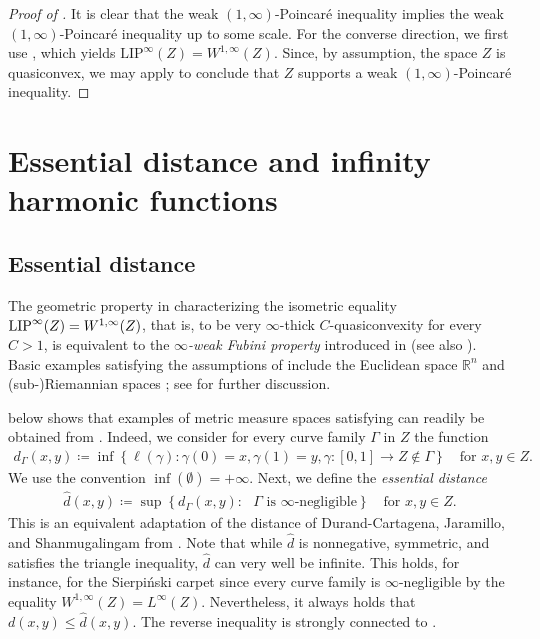 \documentclass[reqno]{amsart}
\newcommand{\LIP}{{\rm LIP}}
\numberwithin{equation}{section}
\theoremstyle{remark}
\begin{document}
\begin{proof}[Proof of ]
It is clear that the weak $(1,\infty)$-Poincaré inequality implies the weak $(1,\infty)$-Poincaré inequality up to some scale. For the converse direction, we first use , which yields $\text{LIP}^{\infty}(Z)=W^{1,\infty}(Z)$. Since, by assumption, the space $Z$ is quasiconvex, we may apply  to conclude that $Z$ supports a weak $(1,\infty)$-Poincaré inequality.
\end{proof}




\section{Essential distance and infinity harmonic functions}\label{sec:essentialdistance:proofs}

\subsection{Essential distance}
The geometric property in   characterizing the isometric equality $\LIP^{\infty}(Z)= W^{1,\infty}(Z)$, that is, to be very $\infty$-thick $C$-quasiconvexity for every $C>1$, is equivalent to the \emph{$\infty$-weak Fubini property} introduced in \cite[Definition 4.1 and Proposition 4.2]{Dur:Jar:Sha:19} (see also \cite{Juut:Shan:06}). Basic examples satisfying the assumptions of  include the Euclidean space $\mathbb{R}^n$ and (sub-)Riemannian spaces \cite{Drag:Manf:Vitt:13}; see \cite[Section 5]{Juut:Shan:06} for further discussion.

 below shows that examples of metric measure spaces satisfying  can readily be obtained from . Indeed, we consider for every curve family $\Gamma$ in $Z$ the function
\begin{align*}
    d_{\Gamma}(x,y)
    \coloneqq
    \inf\left\{
        \ell( \gamma ) \colon \gamma(0) = x, \gamma(1) = y, \gamma \colon [0,1] \rightarrow Z \not\in \Gamma
    \right\}
    \quad\text{for $x,y \in Z$.}
\end{align*}
We use the convention $\inf(\emptyset)=+\infty$. Next, we define the \emph{essential distance}
\begin{align}\label{eq:essentialdistance}
    \widehat{d}( x, y )
    \coloneqq
    \sup\left\{
        d_{\Gamma}(x,y)
        \colon
        \text{ $\Gamma$ is $\infty$-negligible}
    \right\}
    \quad\text{for $x,y \in Z$.}
\end{align}
This is an equivalent adaptation of the distance of Durand-Cartagena, Jaramillo, and Shanmugalingam from \cite[Equation (9)]{Dur:Jar:Sha:19}. Note that while $\widehat{d}$ is nonnegative, symmetric, and satisfies the triangle inequality, $\widehat{d}$ can very well be infinite. This holds, for instance, for the Sierpi\'nski carpet since every curve family is $\infty$-negligible by the equality $W^{1,\infty}(Z) = L^{\infty}(Z)$. Nevertheless, it always holds that $d(x,y) \leq \widehat{d}(x,y)$. The reverse inequality is strongly connected to .
\end{document}
